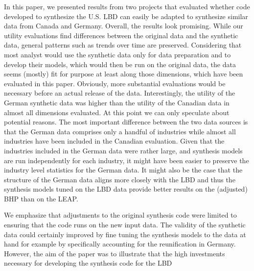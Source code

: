
In this paper, we presented results from two projects that evaluated whether code developed to synthesize the U.S. LBD can easily be adapted to synthesize similar data from Canada and Germany. Overall, the results look promising. While our utility evaluations find differences between the original data and the synthetic data, general patterns such as trends over time are preserved. Considering that most analyst would use the synthetic data only for data preparation and to develop their models, which would then be run on the original data, the data seems (mostly) fit for purpose at least along those dimensions, which have been evaluated in this paper. Obviously, more substantial evaluations would be necessary before an actual release of the data. Interestingly, the utility of the German synthetic data was higher than the utility of the Canadian data in almost all dimensions evaluated. At this point we can only speculate about potential reasons. The most important difference between the two data sources is that the German data comprises only a handful of industries while almost all industries have been included in the Canadian evaluation. Given that the industries included in the German data were rather large, and synthesis models are run independently for each industry, it might have been easier to preserve the industry level statistics for the German data. It might also be the case that the structure of the German data aligns more closely with the LBD and thus the synthesis models tuned on the LBD data provide better results on the (adjusted) BHP than on the LEAP. 

We emphasize that adjustments to the original synthesis code were limited to ensuring that the code runs on the new input data. The validity of the synthetic data could certainly improved by fine tuning the synthesis models to the data at hand for example by specifically accounting for the reunification in Germany. However, the aim of the paper was to illustrate that the high investments necessary for developing the synthesis code for the LBD 
